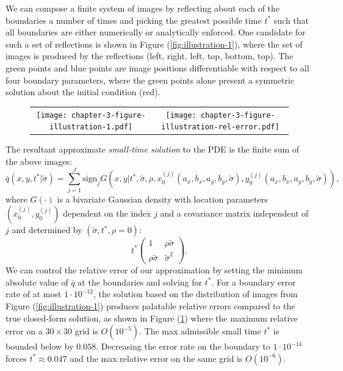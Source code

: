 \documentclass[10pt]{article}
\begin{document}
We can compose a finite system of images by reflecting about each of
the boundaries a number of times and picking the greatest possible
time $t^{*}$ such that all boundaries are either numerically or
analytically enforced. One candidate for such a set of reflections is
shown in Figure (\ref{fig:illustration-1}), where the set of images is
produced by the reflections (left, right, left, top, bottom, top). The
green points and blue points are image positions differentiable with
respect to all four boundary parameters, where the green points alone
present a symmetric solution about the initial condition (red).

\begin{figure}
  \begin{tabular}{cc}
    \begin{minipage}{0.40\textwidth}
      \centering
      \texttt{[image: chapter-3-figure-illustration-1.pdf]}
      \caption{}
      \label{fig:illustration-1}
    \end{minipage}
    & \begin{minipage}{0.40\textwidth}
      \centering
      \texttt{[image: chapter-3-figure-illustration-rel-error.pdf]}
      \caption{}
      \label{fig:illustration-rel-error}
    \end{minipage}
      \end{tabular}
\end{figure}
The resultant approximate \textit{small-time solution} to the PDE is
the finite sum of the above images:
\[
  \bar{q}(x, y, t^{*}|\tilde{\sigma}) = \sum_{j=1}^J \mbox{sign}_j
  G(x,y|t^*, \tilde{\sigma}, \rho, x_0^{(j)}(a_x, b_x, a_y, b_y, \tilde{\sigma}),
  y_0^{(j)}(a_x, b_x, a_y, b_y, \tilde{\sigma})),
\]
where $G(\cdot)$ is a bivariate Gaussian density with location
parameters $(x^{(j)}_0,y^{(j)}_0)$ dependent on the index $j$ and a
covariance matrix independent of $j$ and determined by
$(\tilde{\sigma}, t^*, \rho = 0)$:
\[
  t^{*} \left( \begin{array}{cc}
                 1 & \rho\tilde{\sigma} \\
                 \rho\tilde{\sigma} & \tilde{\sigma}^2
               \end{array} \right).
\]
We can control the relative error of our approximation by setting the
minimum absolute value of $\bar{q}$ at the boundaries and solving for
$t^{*}$. For a boundary error rate of at most $1 \cdot 10^{-12}$, the
solution based on the distribution of images from Figure
(\ref{fig:illustration-1}) produces palatable relative errors compared
to the true closed-form solution, as shown in Figure
(\ref{fig:illustration-rel-error}) where the maximum relative error on
a $30 \times 30$ grid is $O(10^{-5})$. The max admissible small time
$t^*$ is bounded below by $0.058$. Decreasing the error rate on the
boundary to $1 \cdot 10^{-14}$ forces $t^* \approx 0.047$ and the max
relative error on the same grid is $O(10^{-6})$.
\end{document}

